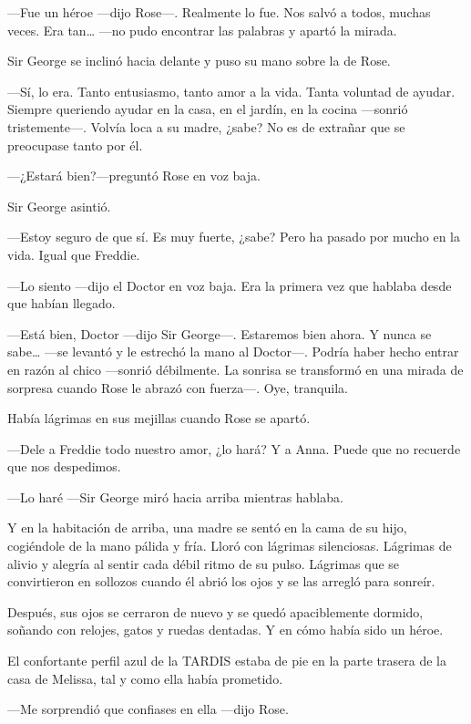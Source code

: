 {---Fue un héroe ---dijo Rose---. Realmente lo fue. Nos salvó a todos,
	muchas veces. Era tan\ldots{} ---no pudo encontrar las palabras y apartó
la mirada.}

{Sir George se inclinó hacia delante y puso su mano sobre la de Rose.}

{---Sí, lo era. Tanto entusiasmo, tanto amor a la vida. Tanta voluntad
	de ayudar. Siempre queriendo ayudar en la casa, en el jardín, en la
	cocina ---sonrió tristemente---. Volvía loca a su madre, ¿sabe? No es de
extrañar que se preocupase tanto por él.}

{---¿Estará bien?---preguntó Rose en voz baja.}

{Sir George asintió.}

{---Estoy seguro de que sí. Es muy fuerte, ¿sabe? Pero ha pasado por
mucho en la vida. Igual que Freddie.}

{---Lo siento ---dijo el Doctor en voz baja. Era la primera vez que
hablaba desde que habían llegado.}

{---Está bien, Doctor ---dijo Sir George---. Estaremos bien ahora. Y
	nunca se sabe\ldots{} ---se levantó y le estrechó la mano al Doctor---.
	Podría haber hecho entrar en razón al chico ---sonrió débilmente. La
	sonrisa se transformó en una mirada de sorpresa cuando Rose le abrazó
con fuerza---. Oye, tranquila.}

{Había lágrimas en sus mejillas cuando Rose se apartó.}

{---Dele a Freddie todo nuestro amor, ¿lo hará? Y a Anna. Puede que no
recuerde que nos despedimos.}

{---Lo haré ---Sir George miró hacia arriba mientras hablaba.}

{Y en la habitación de arriba, una madre se sentó en la cama de su hijo,
	cogiéndole de la mano pálida y fría. Lloró con lágrimas silenciosas.
	Lágrimas de alivio y alegría al sentir cada débil ritmo de su pulso.
	Lágrimas que se convirtieron en sollozos cuando él abrió los ojos y se
las arregló para sonreír.}

{Después, sus ojos se cerraron de nuevo y se quedó apaciblemente
	dormido, soñando con relojes, gatos y ruedas dentadas. Y en cómo había
sido un héroe.}

\mbox{}

{El confortante perfil azul de la TARDIS estaba de pie en la parte
trasera de la casa de Melissa, tal y como ella había prometido.}

{---Me sorprendió que confiases en ella ---dijo Rose.}

